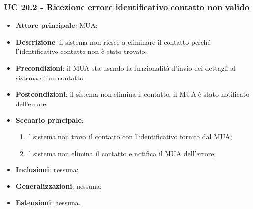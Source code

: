 \subsubsection{UC 20.2 - Ricezione errore identificativo contatto non valido} \label{sec:UC11.2}
    \begin{itemize}
        \item \textbf{Attore principale}: MUA;
        \item \textbf{Descrizione}: il sistema non riesce a eliminare il contatto perché l'identificativo contatto non è stato trovato;
        \item \textbf{Precondizioni}: il MUA sta usando la funzionalità d'invio dei dettagli al sistema di un contatto;
        \item \textbf{Postcondizioni}: il sistema non elimina il contatto, il MUA è stato notificato dell'errore;
        \item \textbf{Scenario principale}:
            \begin{enumerate}
                \item il sistema non trova il contatto con l'identificativo fornito dal MUA;
                \item il sistema non elimina il contatto e notifica il MUA dell'errore;
            \end{enumerate}
        \item \textbf{Inclusioni}: nessuna;
        \item \textbf{Generalizzazioni}: nessuna;
        \item \textbf{Estensioni}: nessuna.
    \end{itemize}
